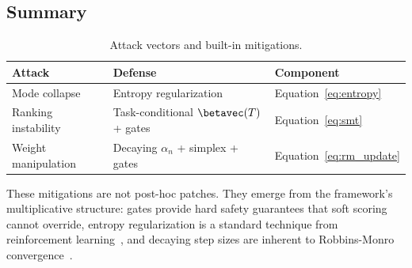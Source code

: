 \subsection{Summary}

\begin{table}[h]
\centering
\caption{Attack vectors and built-in mitigations.}
\label{tab:adversarial}
\small
\begin{tabular}{lll}
\toprule
\textbf{Attack} & \textbf{Defense} & \textbf{Component} \\
\midrule
Mode collapse & Entropy regularization & Equation~\ref{eq:entropy} \\
Ranking instability & Task-conditional $\betavec(T)$ + gates & Equation~\ref{eq:smt} \\
Weight manipulation & Decaying $\alpha_n$ + simplex + gates & Equation~\ref{eq:rm_update} \\
\bottomrule
\end{tabular}
\end{table}

These mitigations are not post-hoc patches. They emerge from the framework's multiplicative structure: gates provide hard safety guarantees that soft scoring cannot override, entropy regularization is a standard technique from reinforcement learning~\citep{haarnoja2018sac}, and decaying step sizes are inherent to Robbins-Monro convergence~\citep{robbins1951stochastic}.
